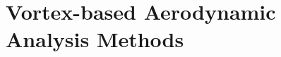 \renewcommand{\sectionquote}{\chapterprecishere{You spin me right 'round, baby, right 'round \\
Like a record, baby, right 'round, 'round, 'round
\par\raggedleft--- \textup{Dead or Alive}}}

\part{Vortex-based Aerodynamic Analysis Methods}
\resetpageformat
\label{part:vortex_methods}
